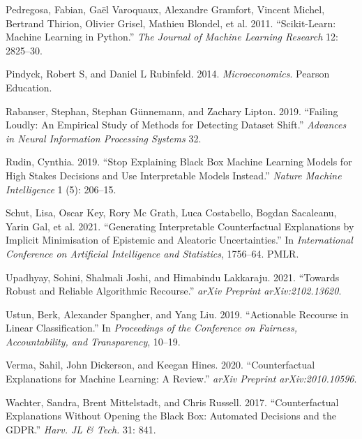 \documentclass[conference,final,]{IEEEtran}
\newlength{\cslhangindent}
\newlength{\cslentryspacingunit} %
\newenvironment{CSLReferences}[2] %
 {%
  \setlength{\parindent}{0pt}
  \ifodd #1
  \let\oldpar\par
  \def\par{\hangindent=\cslhangindent\oldpar}
  \fi
  \setlength{\parskip}{#2\cslentryspacingunit}
 }%
 {}
\begin{document}
\begin{CSLReferences}{1}{0}
\leavevmode{}%
Pedregosa, Fabian, Gaël Varoquaux, Alexandre Gramfort, Vincent Michel, Bertrand Thirion, Olivier Grisel, Mathieu Blondel, et al. 2011. {``Scikit-Learn: Machine Learning in Python.''} \emph{The Journal of Machine Learning Research} 12: 2825--30.

\leavevmode{}%
Pindyck, Robert S, and Daniel L Rubinfeld. 2014. \emph{Microeconomics}. Pearson Education.

\leavevmode{}%
Rabanser, Stephan, Stephan Günnemann, and Zachary Lipton. 2019. {``Failing Loudly: An Empirical Study of Methods for Detecting Dataset Shift.''} \emph{Advances in Neural Information Processing Systems} 32.

\leavevmode{}%
Rudin, Cynthia. 2019. {``Stop Explaining Black Box Machine Learning Models for High Stakes Decisions and Use Interpretable Models Instead.''} \emph{Nature Machine Intelligence} 1 (5): 206--15.

\leavevmode{}%
Schut, Lisa, Oscar Key, Rory Mc Grath, Luca Costabello, Bogdan Sacaleanu, Yarin Gal, et al. 2021. {``Generating Interpretable Counterfactual Explanations by Implicit Minimisation of Epistemic and Aleatoric Uncertainties.''} In \emph{International Conference on Artificial Intelligence and Statistics}, 1756--64. PMLR.

\leavevmode{}%
Upadhyay, Sohini, Shalmali Joshi, and Himabindu Lakkaraju. 2021. {``Towards Robust and Reliable Algorithmic Recourse.''} \emph{arXiv Preprint arXiv:2102.13620}.

\leavevmode{}%
Ustun, Berk, Alexander Spangher, and Yang Liu. 2019. {``Actionable Recourse in Linear Classification.''} In \emph{Proceedings of the Conference on Fairness, Accountability, and Transparency}, 10--19.

\leavevmode{}%
Verma, Sahil, John Dickerson, and Keegan Hines. 2020. {``Counterfactual Explanations for Machine Learning: A Review.''} \emph{arXiv Preprint arXiv:2010.10596}.

\leavevmode{}%
Wachter, Sandra, Brent Mittelstadt, and Chris Russell. 2017. {``Counterfactual Explanations Without Opening the Black Box: Automated Decisions and the GDPR.''} \emph{Harv. JL \& Tech.} 31: 841.


\end{CSLReferences}
\end{document}
